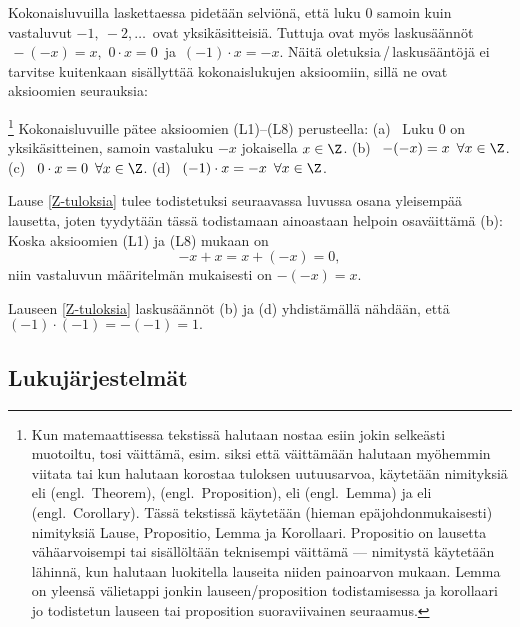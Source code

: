 Kokonaisluvuilla laskettaessa pidetään selviönä, että luku $0$ samoin kuin vastaluvut
$-1,\ -2, \ldots\,$ ovat yksikäsitteisiä. Tuttuja ovat myös laskusäännöt
$\,-(-x)=x$, $\,0 \cdot x=0\,$ ja $\,(-1) \cdot x = -x$. Näitä oletuksia\,/\,laskusääntöjä ei
tarvitse kuitenkaan sisällyttää kokonaislukujen aksioomiin, sillä ne ovat aksioomien seurauksia:
\begin{Lause}\footnote[2]{Kun matemaattisessa tekstissä halutaan nostaa esiin jokin selkeästi 
muotoiltu, tosi väittämä, esim. siksi että väittämään halutaan myöhemmin viitata tai kun 
halutaan korostaa tuloksen uutuusarvoa, käytetään nimityksiä  eli  
(engl.\ Theorem),  (engl.\ Proposition),  eli  
(engl.\ Lemma) ja  eli  (engl.\ Corollary). Tässä tekstissä 
käytetään (hieman epäjohdonmukaisesti) nimityksiä Lause, Propositio, Lemma ja Korollaari. 
Propositio on lausetta vähäarvoisempi tai sisällöltään teknisempi väittämä --- nimitystä 
käytetään lähinnä, kun halutaan luokitella lauseita niiden painoarvon mukaan. Lemma on yleensä
välietappi jonkin lauseen/proposition todistamisessa ja korollaari jo todistetun lauseen tai 
proposition suoraviivainen seuraamus. 
 
} \label{Z-tuloksia}
Kokonaisluvuille pätee aksioomien (L1)--(L8) perusteella: \vspace{1mm}\newline
(a) \ Luku $0$ on yksikäsitteinen, samoin vastaluku $-x$ jokaisella $x\in\Z$. \newline
(b) \ $-(-x)=x\,\ \forall x\in\Z$. \newline
(c) \ $0 \cdot x = 0\,\ \forall x\in\Z$. \newline
(d) \ $(-1) \cdot x = -x\,\ \forall x\in\Z$. 
\end{Lause}
Lause \ref{Z-tuloksia} tulee todistetuksi seuraavassa luvussa osana yleisempää lausetta,
joten tyydytään tässä todistamaan ainoastaan helpoin osaväittämä (b): Koska aksioomien
(L1) ja (L8) mukaan on
\[
-x+x = x+(-x) = 0,
\]
niin vastaluvun määritelmän mukaisesti on $-(-x)=x$. \loppu
\begin{Exa} Lauseen \ref{Z-tuloksia} laskusäännöt (b) ja (d) yhdistämällä nähdään, että
$(-1)\cdot(-1)=-(-1)=1.$ \loppu \end{Exa}

\subsection*{Lukujärjestelmät}
%

